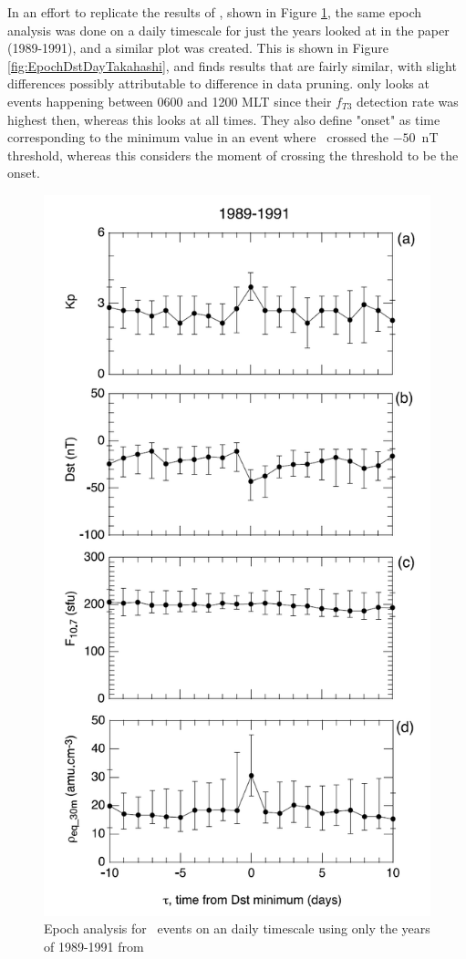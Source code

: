In an effort to replicate the results of \cite{Takahashi2010SolarCycleVariation}, shown in Figure \ref{fig:EpochTakahashi}, the same epoch analysis was done on a daily timescale for just the years looked at in the paper (1989-1991), and a similar plot was created. This is shown in Figure \ref{fig:EpochDstDayTakahashi}, and finds results that are fairly similar, with slight differences possibly attributable to difference in data pruning. \cite{Takahashi2010SolarCycleVariation} only looks at events happening between 0600 and 1200 MLT since their $f_{T3}$ detection rate was highest then, whereas this looks at all times. They also define "onset" as time corresponding to the minimum value in an event where \dst\ crossed the $-50$~nT threshold, whereas this considers the moment of crossing the threshold to be the onset.

\begin{figure}[htp!]
	\centering
	\includegraphics[width=0.7\linewidth]{Figures/StormAvs/stormavs-Takahashi.png}
	\caption{Epoch analysis for \dst\ events on an daily timescale using only the years of 1989-1991 from \citep{Takahashi2010SolarCycleVariation}}
	\label{fig:EpochTakahashi}
\end{figure}


